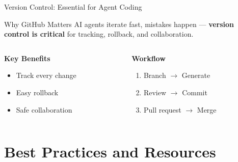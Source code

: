 \documentclass[aspectratio=169]{beamer}
\begin{document}
\begin{frame}{Version Control: Essential for Agent Coding}
  \begin{block}{Why GitHub Matters}
    AI agents iterate fast, mistakes happen --- \textbf{version control is critical} for tracking, rollback, and collaboration.
  \end{block}

  \vspace{0.5cm}

  \begin{columns}[T]
    \begin{column}{0.48\textwidth}
      \centering
      \large\bfseries
      \textcolor{conesaTeal}{Key Benefits}

      \vspace{0.3cm}
      \normalsize

      \begin{itemize}
        \item Track every change
        \item Easy rollback
        \item Safe collaboration
      \end{itemize}
    \end{column}
    \begin{column}{0.48\textwidth}
      \centering
      \large\bfseries
      \textcolor{conesaOrange}{Workflow}

      \vspace{0.3cm}
      \normalsize

      \begin{enumerate}
        \item Branch $\rightarrow$ Generate
        \item Review $\rightarrow$ Commit
        \item Pull request $\rightarrow$ Merge
      \end{enumerate}
    \end{column}
  \end{columns}
\end{frame}

\section{Best Practices and Resources}
\end{document}
